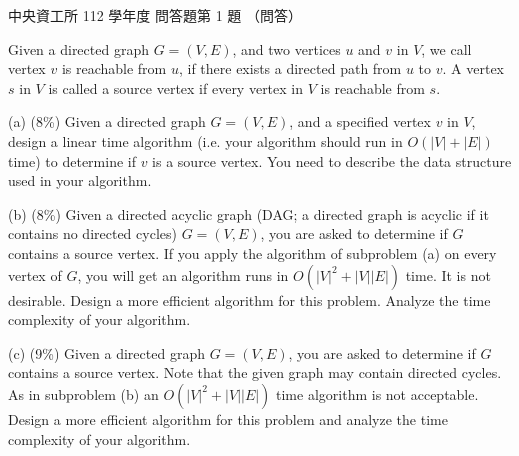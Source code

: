 \begin{pastexam}[label={px:ncu-112-dsa-11}]{中央資工所 112 學年度 問答題第 1 題}
（問答）

Given a directed graph $G=(V,E)$, and two vertices $u$ and $v$ in $V$, we call vertex $v$ is reachable
from $u$, if there exists a directed path from $u$ to $v$. A vertex $s$ in $V$ is called a source vertex
if every vertex in $V$ is reachable from $s$.

(a) (8\%) Given a directed graph $G=(V,E)$, and a specified vertex $v$ in $V$, design a linear time
algorithm (i.e. your algorithm should run in $O(|V|+|E|)$ time) to determine if $v$ is a source vertex.
You need to describe the data structure used in your algorithm.

(b) (8\%) Given a directed acyclic graph (DAG; a directed graph is acyclic if it contains no directed
cycles) $G=(V,E)$, you are asked to determine if $G$ contains a source vertex. If you apply the algorithm
of subproblem (a) on every vertex of $G$, you will get an algorithm runs in $O(|V|^2+|V||E|)$ time. It
is not desirable. Design a more efficient algorithm for this problem. Analyze the time complexity of
your algorithm.

(c) (9\%) Given a directed graph $G=(V,E)$, you are asked to determine if $G$ contains a source vertex.
Note that the given graph may contain directed cycles. As in subproblem (b) an $O(|V|^2+|V||E|)$ time
algorithm is not acceptable. Design a more efficient algorithm for this problem and analyze the time
complexity of your algorithm.
\end{pastexam}

